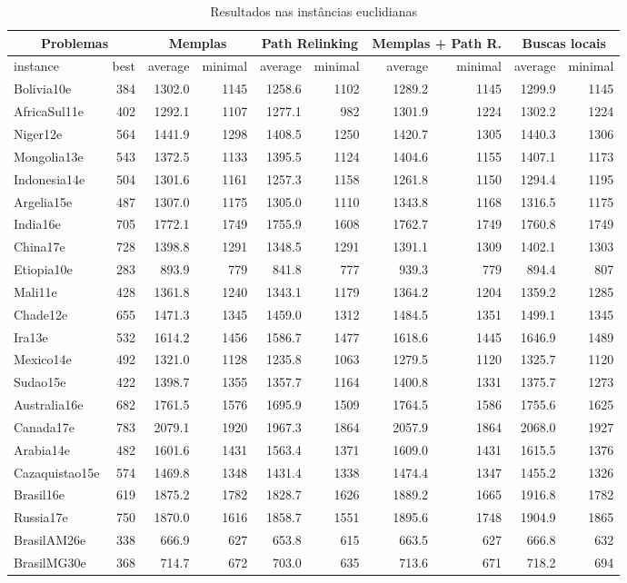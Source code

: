 \begin{landscape}
\begin{table}[htb]

\caption{Resultados nas instâncias euclidianas}
\label{tab:resultadosEuclidianas}
\begin{tabular}{@{}lr|rr|rr|rr|rr@{}}
\toprule
\multicolumn{2}{c}{Problemas}&\multicolumn{2}{c}{Memplas}&\multicolumn{2}{c}{Path Relinking}&\multicolumn{2}{c}{Memplas + Path R.}&\multicolumn{2}{c}{Buscas locais}\\\midrule
instance&best&average&minimal&average&minimal&average&minimal&average&minimal\\\midrule
Bolivia10e&384&1302.0&1145&1258.6&1102&1289.2&1145&1299.9&1145\\
AfricaSul11e&402&1292.1&1107&1277.1&982&1301.9&1224&1302.2&1224\\
Niger12e&564&1441.9&1298&1408.5&1250&1420.7&1305&1440.3&1306\\
Mongolia13e&543&1372.5&1133&1395.5&1124&1404.6&1155&1407.1&1173\\
Indonesia14e&504&1301.6&1161&1257.3&1158&1261.8&1150&1294.4&1195\\
Argelia15e&487&1307.0&1175&1305.0&1110&1343.8&1168&1316.5&1175\\
India16e&705&1772.1&1749&1755.9&1608&1762.7&1749&1760.8&1749\\
China17e&728&1398.8&1291&1348.5&1291&1391.1&1309&1402.1&1303\\
Etiopia10e&283&893.9&779&841.8&777&939.3&779&894.4&807\\
Mali11e&428&1361.8&1240&1343.1&1179&1364.2&1204&1359.2&1285\\
Chade12e&655&1471.3&1345&1459.0&1312&1484.5&1351&1499.1&1345\\
Ira13e&532&1614.2&1456&1586.7&1477&1618.6&1445&1646.9&1489\\
Mexico14e&492&1321.0&1128&1235.8&1063&1279.5&1120&1325.7&1120\\
Sudao15e&422&1398.7&1355&1357.7&1164&1400.8&1331&1375.7&1273\\
Australia16e&682&1761.5&1576&1695.9&1509&1764.5&1586&1755.6&1625\\
Canada17e&783&2079.1&1920&1967.3&1864&2057.9&1864&2068.0&1927\\
Arabia14e&482&1601.6&1431&1563.4&1371&1609.0&1431&1615.5&1376\\
Cazaquistao15e&574&1469.8&1348&1431.4&1338&1474.4&1347&1455.2&1326\\
Brasil16e&619&1875.2&1782&1828.7&1626&1889.2&1665&1916.8&1782\\
Russia17e&750&1870.0&1616&1858.7&1551&1895.6&1748&1904.9&1865\\
BrasilAM26e&338&666.9&627&653.8&615&663.5&627&666.8&632\\
BrasilMG30e&368&714.7&672&703.0&635&713.6&671&718.2&694\\
\bottomrule
\end{tabular}
\end{table}
\end{landscape}
